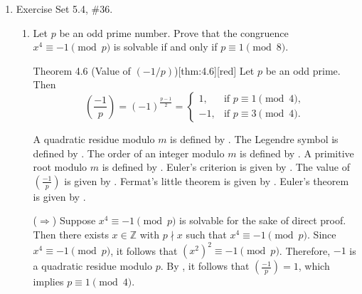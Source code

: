 \begin{enumerate}
\begin{enumerate}
\begin{subprove}
      Since $p-a \equiv r^{\operatorname{ind}_r a + (p-1)/2} \pmod{p}$ and $p-a \equiv r^{\operatorname{ind}_r(p-a)} \pmod{p}$, it follows that
      \[
      r^{\operatorname{ind}_r a + (p-1)/2} \equiv r^{\operatorname{ind}_r(p-a)} \pmod{p}.
      \]
      
      Since the order of $r$ modulo $p$ is $p-1$, by , it follows that
      \[
      \operatorname{ind}_r a + \frac{p-1}{2} \equiv \operatorname{ind}_r(p-a) \pmod{p-1}.
      \]
      Therefore, $\operatorname{ind}_r(p-a) \equiv \operatorname{ind}_r a + \frac{p-1}{2} \pmod{p-1}$.
    \end{subprove}
  \end{enumerate}




  \newpage
  \item Exercise Set 5.4, \#36.
  \begin{enumerate}
    \item Let $p$ be an odd prime number. Prove that the congruence $x^4 \equiv -1 \pmod{p}$ is solvable 
    if and only if $p \equiv 1 \pmod{8}$.
    \begin{define}{Theorem 4.6 (Value of $(-1/p)$)}[thm:4.6][red]
      Let $p$ be an odd prime. Then
      \[
      \left(\frac{-1}{p}\right)=(-1)^{\frac{p-1}{2}}=
      \begin{cases}
      1, & \text{if } p\equiv 1\pmod 4,\\[4pt]
      -1,& \text{if } p\equiv 3\pmod 4.
      \end{cases}
      \]
    \end{define}
    \begin{subprove}
      A quadratic residue modulo $m$ is defined by .
      The Legendre symbol is defined by .
      The order of an integer modulo $m$ is defined by .
      A primitive root modulo $m$ is defined by .
      Euler's criterion is given by .
      The value of $\left(\frac{-1}{p}\right)$ is given by .
      Fermat's little theorem is given by .
      Euler's theorem is given by .
      
      ($\Rightarrow$) Suppose $x^4 \equiv -1 \pmod{p}$ is solvable for the sake of direct proof.
      Then there exists $x \in \mathbb{Z}$ with $p \nmid x$ such that $x^4 \equiv -1 \pmod{p}$.
      Since $x^4 \equiv -1 \pmod{p}$, it follows that $(x^2)^2 \equiv -1 \pmod{p}$.
      Therefore, $-1$ is a quadratic residue modulo $p$.
      By , it follows that $\left(\frac{-1}{p}\right) = 1$, which implies $p \equiv 1 \pmod{4}$.
      

\end{subprove}
\end{enumerate}
\end{enumerate}
